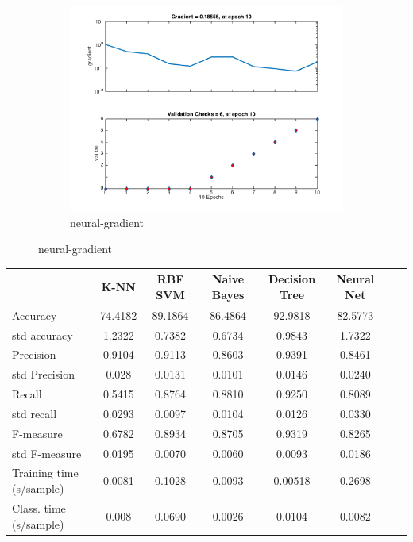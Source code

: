 \documentclass[]{article}
\begin{document}
\begin{figure}[h]
	\begin{subfigure}{.5\textwidth}
		\centering
		\includegraphics[width=1\linewidth]{../images-update/1-(4)-neural_gradient.png}
		\caption{neural-gradient}
		\label{fig:sub1}
	\end{subfigure}
	
	
	\end{figure}
	
	
\begin{tabular}
	{l*{6}{c}r}   	& K-NN  & RBF SVM & Naive Bayes & Decision Tree & Neural Net \\ \hline
	Accuracy & 74.4182 & 89.1864 & 86.4864 & 92.9818 & 82.5773 \\ 
	std accuracy & 1.2322 & 0.7382 & 0.6734 & 0.9843 & 1.7322 \\ \hline
	Precision & 0.9104 & 0.9113 & 0.8603 &0.9391 & 0.8461\\
	std Precision & 0.028 & 0.0131 & 0.0101 & 0.0146 & 0.0240\\ \hline
	Recall & 0.5415 & 0.8764 & 0.8810 & 0.9250 & 0.8089\\
	std recall & 0.0293 & 0.0097 & 0.0104 & 0.0126 & 0.0330\\ \hline
	F-measure & 0.6782 & 0.8934 & 0.8705 & 0.9319 & 0.8265 \\
	std F-measure & 0.0195 & 0.0070 & 0.0060 & 0.0093 & 0.0186 \\ \hline
	Training time (s/sample) &  0.0081 & 0.1028 & 0.0093 & 0.00518 & 0.2698 \\
	Class. time (s/sample) & 0.008 & 0.0690 & 0.0026 & 0.0104 & 0.0082 \\ \hline
\end{tabular}
\end{document}
